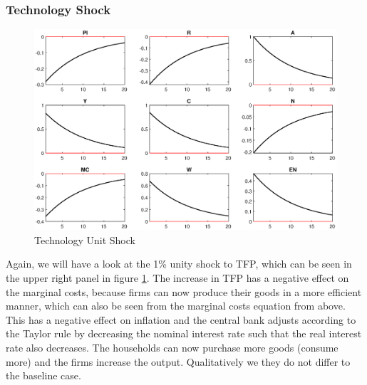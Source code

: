 \documentclass[a4paper,11pt]{article}
\begin{document}
\subsubsection{Technology Shock}
\begin{figure}[H]
\centering
\includegraphics[scale=0.7]{figures/techshock.eps}
\caption{Technology Unit Shock}
\label{fig:techshock}
\end{figure}
Again, we will have a look at the 1\% unity shock to TFP, which can be seen in the upper right panel in figure \ref{fig:techshock}. The increase in TFP has a negative effect on the marginal costs, because firms can now produce their goods in a more efficient manner, which can also be seen from the marginal costs equation from above. This has a negative effect on inflation and the central bank adjusts according to the Taylor rule by decreasing the nominal interest rate such that the real interest rate also decreases. The households can now purchase more goods (consume more) and the firms increase the output. Qualitatively we they do not differ to the baseline case.   
\end{document}
